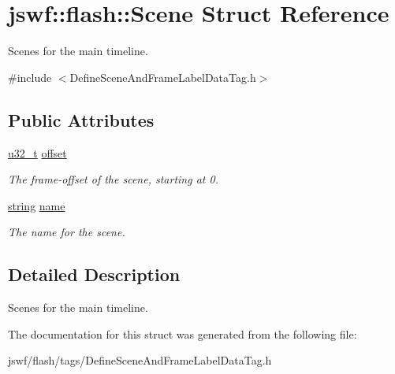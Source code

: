 \hypertarget{structjswf_1_1flash_1_1_scene}{\section{jswf\+:\+:flash\+:\+:Scene Struct Reference}
\label{structjswf_1_1flash_1_1_scene}
}


Scenes for the main timeline.  




{\ttfamily \#include $<$Define\+Scene\+And\+Frame\+Label\+Data\+Tag.\+h$>$}

\subsection*{Public Attributes}
\begin{DoxyCompactItemize}
\item 
\hypertarget{structjswf_1_1flash_1_1_scene_a25872111801dbf3691ac83fdbc664cbc}{\hyperlink{namespacejswf_ae68dd480b6437e9a20db7b004283a466}{u32\+\_\+t} \hyperlink{structjswf_1_1flash_1_1_scene_a25872111801dbf3691ac83fdbc664cbc}{offset}}\label{structjswf_1_1flash_1_1_scene_a25872111801dbf3691ac83fdbc664cbc}

\begin{DoxyCompactList}\small\item\em The frame-\/offset of the scene, starting at 0. \end{DoxyCompactList}\item 
\hypertarget{structjswf_1_1flash_1_1_scene_ac90d3f093bd379e25e7895508490cb8c}{\hyperlink{namespacejswf_a755127d61081aa8af105eb800aa2c1ec}{string} \hyperlink{structjswf_1_1flash_1_1_scene_ac90d3f093bd379e25e7895508490cb8c}{name}}\label{structjswf_1_1flash_1_1_scene_ac90d3f093bd379e25e7895508490cb8c}

\begin{DoxyCompactList}\small\item\em The name for the scene. \end{DoxyCompactList}\end{DoxyCompactItemize}


\subsection{Detailed Description}
Scenes for the main timeline. 

The documentation for this struct was generated from the following file\+:\begin{DoxyCompactItemize}
\item 
jswf/flash/tags/Define\+Scene\+And\+Frame\+Label\+Data\+Tag.\+h\end{DoxyCompactItemize}
